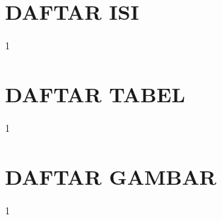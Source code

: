 \makeatletter

\clearpage
\chapter*{DAFTAR ISI}
\begin{spacing}{1}
\end{spacing}

\clearpage
\chapter*{DAFTAR TABEL}
\begin{spacing}{1}
\end{spacing}

\clearpage
\chapter*{DAFTAR GAMBAR}
\begin{spacing}{1}
\end{spacing}

\makeatother
